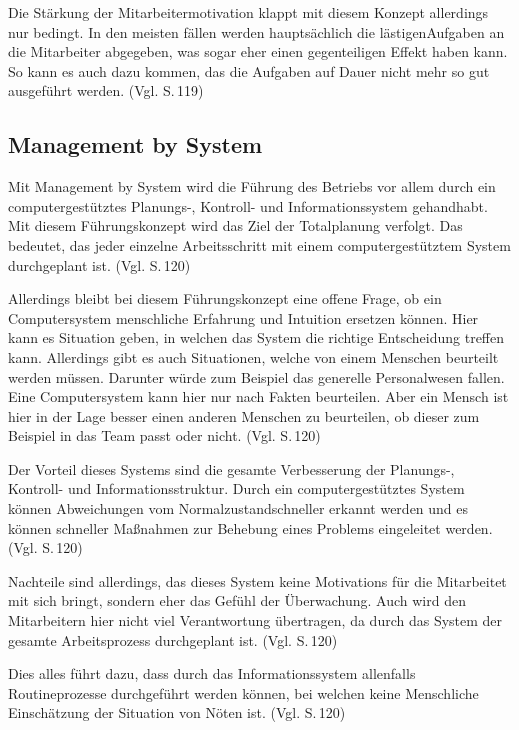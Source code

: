         Die Stärkung der Mitarbeitermotivation klappt mit diesem Konzept allerdings nur bedingt. In den meisten fällen
        werden hauptsächlich die \as lästigen\adl Aufgaben an die Mitarbeiter abgegeben, was sogar eher einen 
        gegenteiligen Effekt haben kann. So kann es auch dazu kommen, das die Aufgaben auf Dauer nicht mehr so gut 
        ausgeführt werden. (Vgl. \cite{Woehe2020} S.\,119)

    \subsection{Management by System} \label{System}
        Mit Management by System wird die Führung des Betriebs vor allem durch ein computergestütztes Planungs-,
        Kontroll- und Informationssystem gehandhabt. Mit diesem Führungskonzept wird das Ziel der Totalplanung verfolgt.
        Das bedeutet, das jeder einzelne Arbeitsschritt mit einem computergestütztem System durchgeplant ist.
        (Vgl.\cite{Woehe2020} S.\,120)

        Allerdings bleibt bei diesem Führungskonzept eine offene Frage, ob ein Computersystem menschliche Erfahrung und 
        Intuition ersetzen können. Hier kann es Situation geben, in welchen das System die richtige Entscheidung treffen
        kann. Allerdings gibt es auch Situationen, welche von einem Menschen beurteilt werden müssen. Darunter würde zum
        Beispiel das generelle Personalwesen fallen. Eine Computersystem kann hier nur nach Fakten beurteilen. Aber ein
        Mensch ist hier in der Lage besser einen anderen Menschen zu beurteilen, ob dieser zum Beispiel in das Team 
        passt oder nicht. (Vgl. \cite{Woehe2020} S.\,120)

        Der Vorteil dieses Systems sind die gesamte Verbesserung der Planungs-, Kontroll- und Informationsstruktur.
        Durch ein computergestütztes System können Abweichungen vom \as Normalzustand\adl schneller erkannt werden und
        es können schneller Maßnahmen zur Behebung eines Problems eingeleitet werden. (Vgl. \cite{Woehe2020} S.\,120)

        Nachteile sind allerdings, das dieses System keine Motivations für die Mitarbeitet mit sich bringt, sondern eher
        das Gefühl der Überwachung. Auch wird den Mitarbeitern hier nicht viel Verantwortung übertragen, da durch das 
        System der gesamte Arbeitsprozess durchgeplant ist. (Vgl. \cite{Woehe2020} S.\,120)

        Dies alles führt dazu, dass durch das Informationssystem allenfalls Routineprozesse durchgeführt werden können,
        bei welchen keine Menschliche Einschätzung der Situation von Nöten ist. (Vgl. \cite{Woehe2020} S.\,120)

